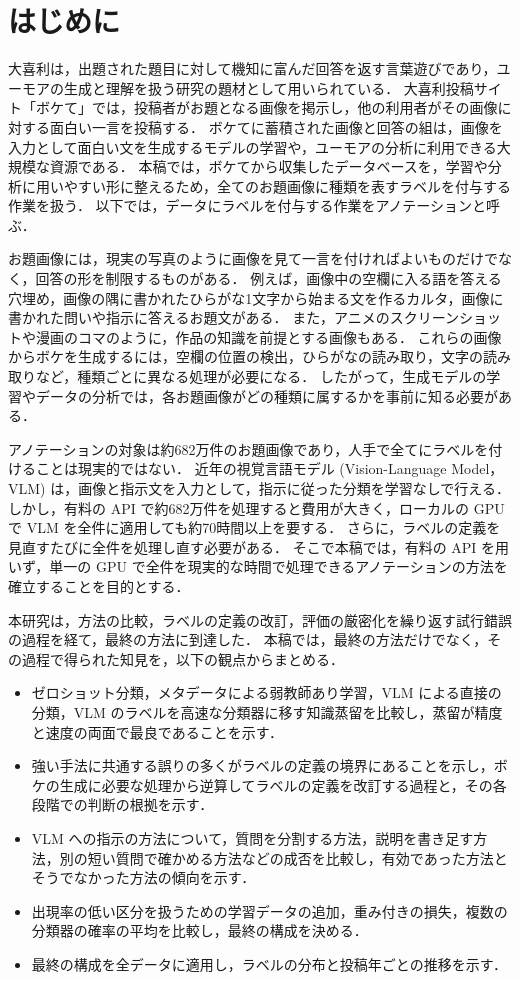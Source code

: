 \section{はじめに}
大喜利は，出題された題目に対して機知に富んだ回答を返す言葉遊びであり，ユーモアの生成と理解を扱う研究の題材として用いられている．
大喜利投稿サイト「ボケて」\cite{ref_bokete}では，投稿者がお題となる画像を掲示し，他の利用者がその画像に対する面白い一言を投稿する．
ボケてに蓄積された画像と回答の組は，画像を入力として面白い文を生成するモデルの学習や，ユーモアの分析に利用できる大規模な資源である．
本稿では，ボケてから収集したデータベースを，学習や分析に用いやすい形に整えるため，全てのお題画像に種類を表すラベルを付与する作業を扱う．
以下では，データにラベルを付与する作業をアノテーションと呼ぶ．

お題画像には，現実の写真のように画像を見て一言を付ければよいものだけでなく，回答の形を制限するものがある．
例えば，画像中の空欄に入る語を答える穴埋め，画像の隅に書かれたひらがな1文字から始まる文を作るカルタ，画像に書かれた問いや指示に答えるお題文がある．
また，アニメのスクリーンショットや漫画のコマのように，作品の知識を前提とする画像もある．
これらの画像からボケを生成するには，空欄の位置の検出，ひらがなの読み取り，文字の読み取りなど，種類ごとに異なる処理が必要になる．
したがって，生成モデルの学習やデータの分析では，各お題画像がどの種類に属するかを事前に知る必要がある．

アノテーションの対象は約682万件のお題画像であり，人手で全てにラベルを付けることは現実的ではない．
近年の視覚言語モデル (Vision-Language Model，VLM) は，画像と指示文を入力として，指示に従った分類を学習なしで行える．
しかし，有料の API で約682万件を処理すると費用が大きく，ローカルの GPU で VLM を全件に適用しても約70時間以上を要する．
さらに，ラベルの定義を見直すたびに全件を処理し直す必要がある．
そこで本稿では，有料の API を用いず，単一の GPU で全件を現実的な時間で処理できるアノテーションの方法を確立することを目的とする．

本研究は，方法の比較，ラベルの定義の改訂，評価の厳密化を繰り返す試行錯誤の過程を経て，最終の方法に到達した．
本稿では，最終の方法だけでなく，その過程で得られた知見を，以下の観点からまとめる．
\begin{itemize}
    \item ゼロショット分類，メタデータによる弱教師あり学習，VLM による直接の分類，VLM のラベルを高速な分類器に移す知識蒸留を比較し，蒸留が精度と速度の両面で最良であることを示す．
    \item 強い手法に共通する誤りの多くがラベルの定義の境界にあることを示し，ボケの生成に必要な処理から逆算してラベルの定義を改訂する過程と，その各段階での判断の根拠を示す．
    \item VLM への指示の方法について，質問を分割する方法，説明を書き足す方法，別の短い質問で確かめる方法などの成否を比較し，有効であった方法とそうでなかった方法の傾向を示す．
    \item 出現率の低い区分を扱うための学習データの追加，重み付きの損失，複数の分類器の確率の平均を比較し，最終の構成を決める．
    \item 最終の構成を全データに適用し，ラベルの分布と投稿年ごとの推移を示す．
\end{itemize}

